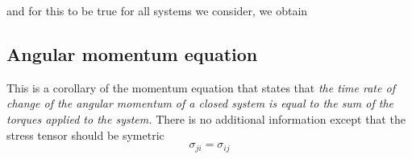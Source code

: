 	and for this to be true for all systems we consider, we obtain
	\begin{center}
		\end{center}
		
	\begin{center}
		\end{center}
		
	\subsection{Angular momentum equation}
		This is a corollary of the momentum equation that states that \textit{the time rate of change of the angular momentum of a closed system is equal to the sum of the torques applied to the system.} There is no additional information except that the stress tensor should be symetric 
		\begin{equation}
			\sigma _{ji} = \sigma _{ij}
		\end{equation}
		
